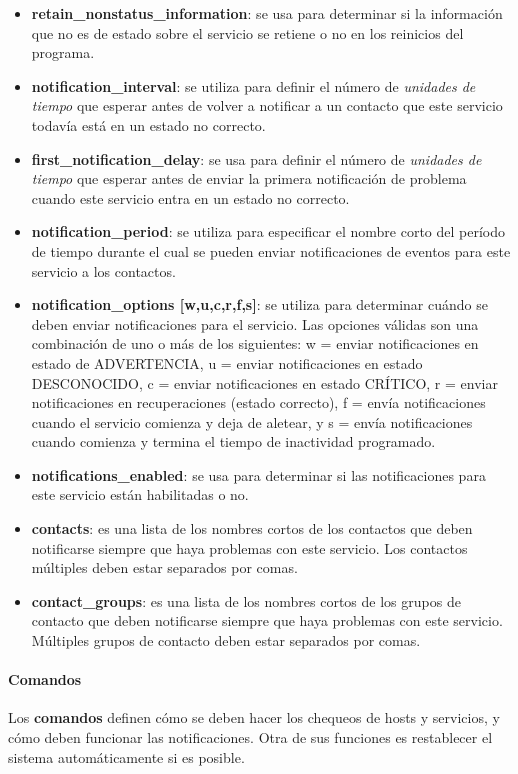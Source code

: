 \begin{itemize}
	\item \textbf{retain\_nonstatus\_information}: se usa para determinar si la información que no es de estado sobre el servicio se retiene o no en los reinicios del programa.	
	\item \textbf{notification\_interval}: se utiliza para definir el número de \textit{unidades de tiempo} que esperar antes de volver a notificar a un contacto que este servicio todavía está en un estado no correcto. 	
	\item \textbf{first\_notification\_delay}: se usa para definir el número de \textit{unidades de tiempo} que esperar antes de enviar la primera notificación de problema cuando este servicio entra en un estado no correcto. 
	\item \textbf{notification\_period}: se utiliza para especificar el nombre corto del período de tiempo durante el cual se pueden enviar notificaciones de eventos para este servicio a los contactos. 
	\item \textbf{notification\_options	[w,u,c,r,f,s]}: se utiliza para determinar cuándo se deben enviar notificaciones para el servicio. Las opciones válidas son una combinación de uno o más de los siguientes: w = enviar notificaciones en estado de ADVERTENCIA, u = enviar notificaciones en estado DESCONOCIDO, c = enviar notificaciones en estado CRÍTICO, r = enviar notificaciones en recuperaciones (estado correcto), f = envía notificaciones cuando el servicio comienza y deja de aletear, y s = envía notificaciones cuando comienza y termina el tiempo de inactividad programado. 
	\item \textbf{notifications\_enabled}: se usa para determinar si las notificaciones para este servicio están habilitadas o no.	
	\item \textbf{contacts}: es una lista de los nombres cortos de los contactos que deben notificarse siempre que haya problemas con este servicio. Los contactos múltiples deben estar separados por comas.	
	\item \textbf{contact\_groups}: es una lista de los nombres cortos de los grupos de contacto que deben notificarse siempre que haya problemas con este servicio. Múltiples grupos de contacto deben estar separados por comas. 	
\end{itemize}
\paragraph{Comandos}

Los \textbf{comandos} definen cómo se deben hacer los chequeos de hosts y servicios, y cómo deben funcionar las notificaciones. Otra de sus funciones es restablecer el sistema automáticamente si es posible. \cite{naemoncfg}

